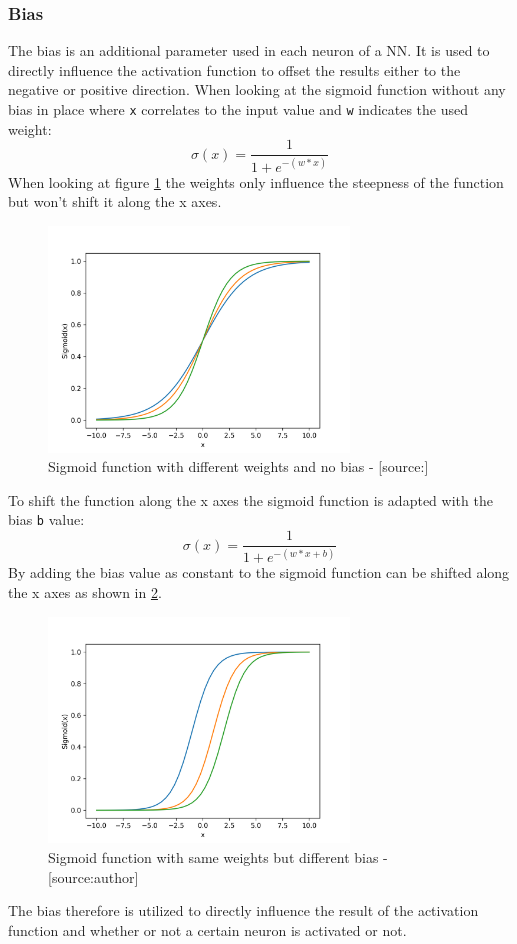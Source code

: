 \subsubsection{Bias}
The bias is an additional parameter used in each neuron of a NN. It is used to directly influence the activation function to offset the results either to the negative or positive direction. When looking at the sigmoid function without any bias in place where \verb|x| correlates to the input value and \verb|w| indicates the used weight: 
\begin{equation}
 \sigma(x) = \frac{1} {1 + e^{-{(w*x)}}}
\label{eq:eq_4}
\end{equation}
When looking at figure \ref{fig:sig_wo_bias} the weights only influence the steepness of the function but won't shift it along the x axes.
\begin{figure}[H]
	\centering
		\includegraphics[width=8cm]{images/sigmoid_w_weights}
	\caption{Sigmoid function with different weights and no bias - [source:\cite{lstm_module}]}
	\label{fig:sig_wo_bias}
\end{figure}
 To shift the function along the x axes the sigmoid function is adapted with the bias \verb|b| value: 
\begin{equation}
 \sigma(x) = \frac{1} {1 + e^{-{(w*x+b)}}}
\label{eq:eq_4}
\end{equation}
By adding the bias value as constant to the sigmoid function can be shifted along the x axes as shown in \ref{fig:sig_w_bias}.
\begin{figure}[H]
	\centering
		\includegraphics[width=8cm]{images/bias}
	\caption{Sigmoid function with same weights but different bias - [source:author]}
	\label{fig:sig_w_bias}
\end{figure}
The bias therefore is utilized to directly influence the result of the activation function and whether or not a certain neuron is activated or not. 
